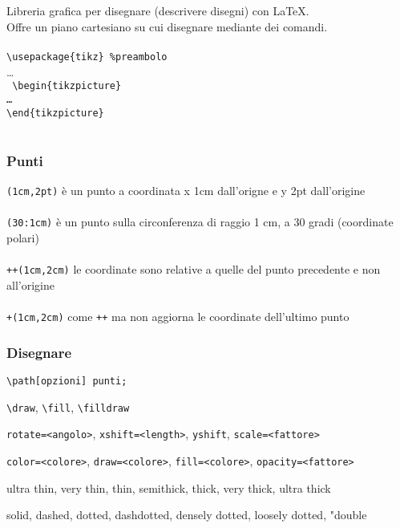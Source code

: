 \section{\Tikz}
\begin{frame}\centering
\frametitle{\Tikz}
  Libreria grafica per disegnare (descrivere disegni) con LaTeX.\\\pause
  Offre un piano cartesiano su cui disegnare mediante dei comandi.\\~\\\pause
  \texttt{\textbackslash{}usepackage\{tikz\} \%preambolo}\\\pause
  \dots\\\texttt{
  \textbackslash{}begin\{tikzpicture\}\\
  \dots\\
  \textbackslash{}end\{tikzpicture\}~~\\~}
\end{frame}
\begin{frame}\centering
\frametitle{Punti}
  \texttt{(1cm,2pt)} è un punto a coordinata x 1cm dall'origne e y 2pt dall'origine\\~\\\pause
  \texttt{(30:1cm)} è un punto sulla circonferenza di raggio 1 cm, a 30 gradi (coordinate polari)\\~\\\pause
  \texttt{++(1cm,2cm)} le coordinate sono relative a quelle del punto precedente e non all'origine\\~\\\pause
  \texttt{+(1cm,2cm)} come \texttt{++} ma non aggiorna le coordinate dell'ultimo punto
\end{frame}
\begin{frame}\centering
\frametitle{Disegnare}
  \texttt{\textbackslash{}path[opzioni] punti;}\\\pause
  \begin{description}
    \item<2->[path type] \texttt{\textbackslash{}draw}, \texttt{\textbackslash{}fill}, \texttt{\textbackslash{}filldraw}
    \item<3->[geometria] \texttt{rotate=<angolo>}, \texttt{xshift=<length>}, \texttt{yshift}, \texttt{scale=<fattore>}
    \item<4->[colore] \texttt{color=<colore>}, \texttt{draw=<colore>}, \texttt{fill=<colore>}, \texttt{opacity=<fattore>}
    \item<5->[spessore linee] ultra thin, very thin, thin, semithick, thick, very thick, ultra thick
    \item<6->[tratteggio] solid, dashed, dotted, dashdotted, densely dotted, loosely dotted, "double
  \end{description}
\end{frame}

